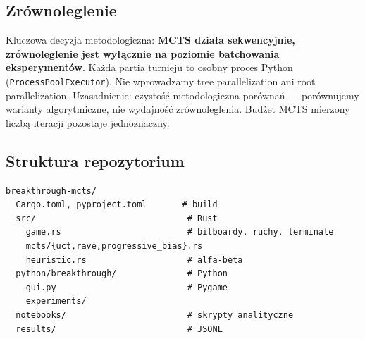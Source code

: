 \documentclass[12pt,a4paper]{article}
\begin{document}
\subsection{Zrównoleglenie}

Kluczowa decyzja metodologiczna: \textbf{MCTS działa sekwencyjnie, zrównoleglenie jest wyłącznie na poziomie batchowania eksperymentów}. Każda partia turnieju to osobny proces Python (\texttt{ProcessPoolExecutor}). Nie wprowadzamy tree parallelization ani root parallelization. Uzasadnienie: czystość metodologiczna porównań --- porównujemy warianty algorytmiczne, nie wydajność zrównoleglenia. Budżet MCTS mierzony liczbą iteracji pozostaje jednoznaczny.



\subsection{Struktura repozytorium}

\begin{verbatim}
breakthrough-mcts/
  Cargo.toml, pyproject.toml       # build
  src/                              # Rust
    game.rs                         # bitboardy, ruchy, terminale
    mcts/{uct,rave,progressive_bias}.rs
    heuristic.rs                    # alfa-beta
  python/breakthrough/              # Python
    gui.py                          # Pygame
    experiments/
  notebooks/                        # skrypty analityczne
  results/                          # JSONL
\end{verbatim}



\printbibliography[title={Bibliografia}]
\end{document}
